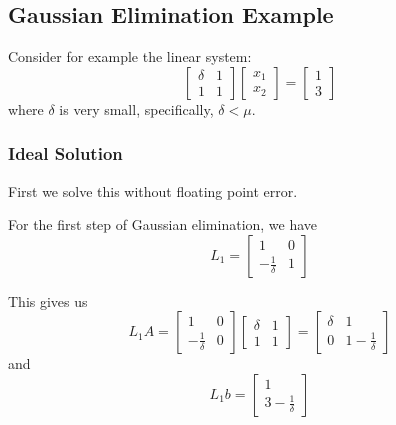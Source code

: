 \documentclass[12pt,letterpaper]{article}
\begin{document}
\subsection{Gaussian Elimination Example}

Consider for example the linear system:
\begin{equation} \label{eq:ex_sys}
\begin{bmatrix}
	\delta & 1 \\
	1 & 1
\end{bmatrix} \begin{bmatrix}
	x_1 \\ x_2
\end{bmatrix} =
\begin{bmatrix}
	1 \\ 3
\end{bmatrix}
\end{equation}
where $\delta$ is very small, specifically, $\delta < \mu$.

\subsubsection{Ideal Solution}
First we solve this without floating point error.

For the first step of Gaussian elimination, we have
\begin{equation}
L_1 = \begin{bmatrix}
	1 & 0 \\
	-\frac{1}{\delta} & 1
\end{bmatrix}
\end{equation}

This gives us
\begin{equation}
L_1 A = \begin{bmatrix}
	1 & 0 \\
	-\frac{1}{\delta} & 0
\end{bmatrix} \begin{bmatrix}
	\delta & 1 \\
	1 & 1
\end{bmatrix} =
\begin{bmatrix}
	\delta & 1 \\
	0 & 1-\frac{1}{\delta}
\end{bmatrix}
\end{equation}
and
\begin{equation}
L_1 b = \begin{bmatrix}
	1 \\ 3-\frac{1}{\delta}
\end{bmatrix}
\end{equation}
\end{document}
